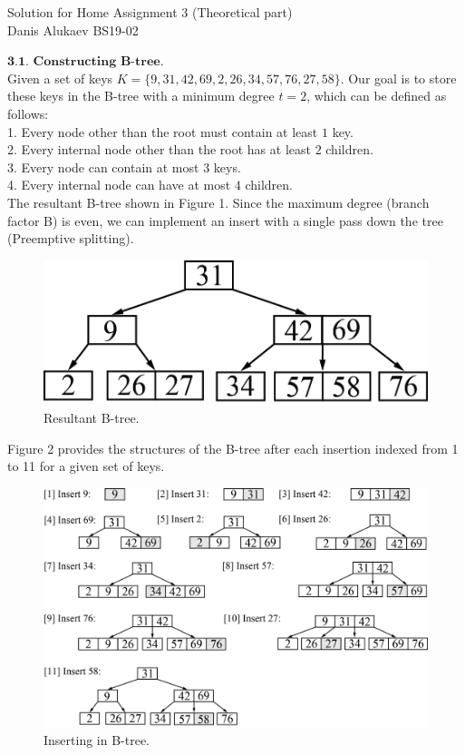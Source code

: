 \documentclass[11pt]{article}
\begin{document}
{\centering
  \large Solution for Home Assignment 3 (Theoretical part)\\
   Danis Alukaev BS19-02\\ \par
}
\renewcommand*\Call[2]{\textproc{#1}(#2)}
\bigbreak
\noindent $\textbf{3.1. Constructing B-tree}$.\\
\noindent Given a set of keys $K = \{9, 31, 42, 69, 2, 26, 34, 57, 76, 27, 58\}$. Our goal is to store these keys in the B-tree with a minimum degree $t=2$, which can be defined as follows:\\
1. Every node other than the root must contain at least $1$ key.\\
2. Every internal node other than the root has at least $2$ children.\\
3. Every node can contain at most $3$ keys.\\ 
4. Every internal node can have at most $4$ children. \\
The resultant B-tree shown in Figure 1. Since the maximum degree (branch factor B) is even, we can implement an insert with a single pass down the tree (Preemptive splitting). 

\begin{figure}[h]
\centering
\includegraphics[width=0.35\linewidth]{DSA_1.jpg}
\caption{Resultant B-tree.}
\label{fig:mpr}
\end{figure}

\noindent Figure 2 provides the structures of the B-tree after each insertion indexed from 1 to 11 for a given set of keys.

\begin{figure}[h]
\centering
\includegraphics[width=0.85\linewidth]{DSA_2.jpg}
\caption{Inserting in B-tree.}
\label{fig:mpr}
\end{figure}
\end{document}
